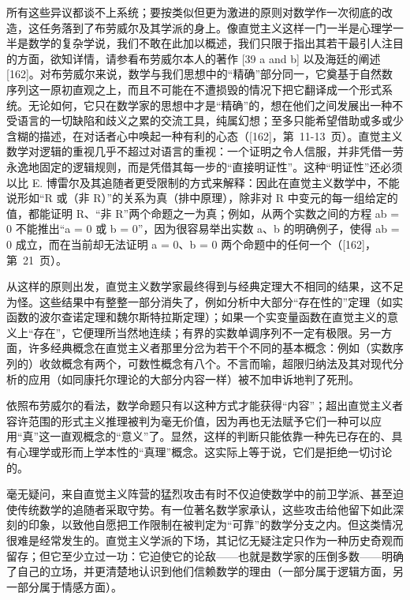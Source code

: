 所有这些异议都谈不上系统；要按类似但更为激进的原则对数学作一次彻底的改造，这任务落到了布劳威尔及其学派的身上。像直觉主义这样一门一半是心理学一半是数学的复杂学说，我们不敢在此加以概述，我们只限于指出其若干最引人注目的方面，欲知详情，请参看布劳威尔本人的著作 {[}39 a and b{]} 以及海廷的阐述 {[}162{]}。对布劳威尔来说，数学与我们思想中的“精确”部分同一，它奠基于自然数序列这一原初直观之上，而且不可能在不遭损毁的情况下把它翻译成一个形式系统。无论如何，它只在数学家的思想中才是“精确”的，想在他们之间发展出一种不受语言的一切缺陷和歧义之累的交流工具，纯属幻想；至多只能希望借助或多或少含糊的描述，在对话者心中唤起一种有利的心态（{[}162{]}，第~11-13~页）。直觉主义数学对逻辑的重视几乎不超过对语言的重视：一个证明之令人信服，并非凭借一劳永逸地固定的逻辑规则，而是凭借其每一步的“直接明证性”。这种“明证性”还必须以比 E. 博雷尔及其追随者更受限制的方式来解释：因此在直觉主义数学中，不能说形如“R 或（非 R）”的关系为真（排中原理），除非对 R 中变元的每一组给定的值，都能证明 R、“非 R”两个命题之一为真；例如，从两个实数之间的方程 ab = 0 不能推出“a = 0 或 b = 0”，因为很容易举出实数 a、b 的明确例子，使得 ab = 0 成立，而在当前却无法证明 a = 0、b = 0 两个命题中的任何一个（{[}162{]}，第~21~页）。

从这样的原则出发，直觉主义数学家最终得到与经典定理大不相同的结果，这不足为怪。这些结果中有整整一部分消失了，例如分析中大部分“存在性的”定理（如实函数的波尔查诺定理和魏尔斯特拉斯定理）；如果一个实变量函数在直觉主义的意义上“存在”，它便理所当然地连续；有界的实数单调序列不一定有极限。另一方面，许多经典概念在直觉主义者那里分岔为若干个不同的基本概念：例如（实数序列的）收敛概念有两个，可数性概念有八个。不言而喻，超限归纳法及其对现代分析的应用（如同康托尔理论的大部分内容一样）被不加申诉地判了死刑。

依照布劳威尔的看法，数学命题只有以这种方式才能获得“内容”；超出直觉主义者容许范围的形式主义推理被判为毫无价值，因为再也无法赋予它们一种可以应用“真”这一直观概念的“意义”了。显然，这样的判断只能依靠一种先已存在的、具有心理学或形而上学本性的“真理”概念。这实际上等于说，它们是拒绝一切讨论的。

毫无疑问，来自直觉主义阵营的猛烈攻击有时不仅迫使数学中的前卫学派、甚至迫使传统数学的追随者采取守势。有一位著名数学家承认，这些攻击给他留下如此深刻的印象，以致他自愿把工作限制在被判定为“可靠”的数学分支之内。但这类情况很难是经常发生的。直觉主义学派的下场，其记忆无疑注定只作为一种历史奇观而留存；但它至少立过一功：它迫使它的论敌——也就是数学家的压倒多数——明确了自己的立场，并更清楚地认识到他们信赖数学的理由（一部分属于逻辑方面，另一部分属于情感方面）。

